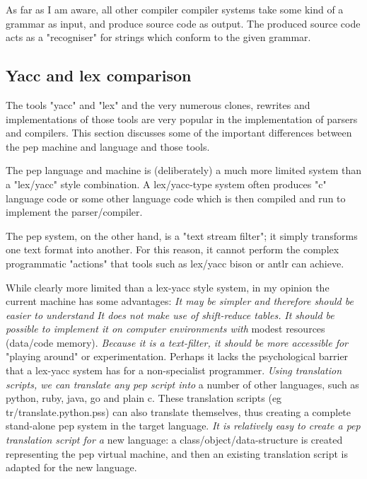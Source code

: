 \documentclass[a4paper,12pt]{article}
\begin{document}
  As far as I am aware, all other compiler compiler systems take
  some kind of a grammar as input, and produce source code as
  output. The produced source code acts as a "recogniser" for
  strings which conform to the given grammar.

\subsection{Yacc and lex comparison}

  The tools "yacc" and "lex" and the very numerous clones, rewrites
  and implementations of those tools are very popular in the implementation
  of parsers and compilers. This section discusses some of the
  important differences between the pep machine and language and
  those tools.

  The pep language and machine is (deliberately) a much more limited system
  than a "lex/yacc" style combination. A lex/yacc-type system often produces "c"
  language code or some other language code which is then compiled and run to
  implement the parser/compiler.

  The pep system, on the other hand, is a "text stream filter"; it simply
  transforms one text format into another. For this reason, it cannot
  perform the complex programmatic "actions" that tools such as lex/yacc
  bison or antlr can achieve.

  While clearly more limited than a lex-yacc style system, in my opinion
  the current machine has some advantages:
 \emph{ It may be simpler and therefore should be easier to understand }
 \emph{ It does not make use of shift-reduce tables. }
 \emph{ It should be possible to implement it on computer environments with }
      modest resources (data/code memory).
 \emph{ Because it is a text-filter, it should be more accessible for }
      "playing around" or experimentation. Perhaps it lacks the
      psychological barrier that a lex-yacc system has for a
      non-specialist programmer.
 \emph{ Using translation scripts, we can translate any pep script into }
      a number of other languages, such as python, ruby, java, go and
      plain c. These translation scripts (eg tr/translate.python.pss)
      can also translate themselves, thus creating a complete stand-alone
      pep system in the target language.
 \emph{ It is relatively easy to create a pep translation script for a  }
      new language: a class/object/data-structure is created representing
      the pep virtual machine, and then an existing translation script
      is adapted for the new language.
\end{document}
